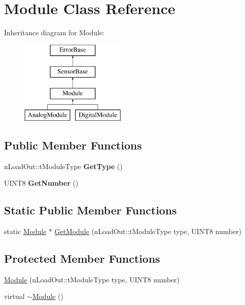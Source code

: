 \hypertarget{classModule}{
\section{Module Class Reference}
\label{classModule}
}
Inheritance diagram for Module:\begin{figure}[H]
\begin{center}
\leavevmode
\includegraphics[height=4.000000cm]{classModule}
\end{center}
\end{figure}
\subsection*{Public Member Functions}
\begin{DoxyCompactItemize}
\item 
\hypertarget{classModule_a2f5d1b9ba82cf4661ecf0306824fdce6}{
nLoadOut::tModuleType {\bfseries GetType} ()}
\label{classModule_a2f5d1b9ba82cf4661ecf0306824fdce6}

\item 
\hypertarget{classModule_ac414ba5cf992fdf69135d29cd3663fa6}{
UINT8 {\bfseries GetNumber} ()}
\label{classModule_ac414ba5cf992fdf69135d29cd3663fa6}

\end{DoxyCompactItemize}
\subsection*{Static Public Member Functions}
\begin{DoxyCompactItemize}
\item 
static \hyperlink{classModule}{Module} $\ast$ \hyperlink{classModule_a1f5bf14617d367a0cbe99d84a5eecb8b}{GetModule} (nLoadOut::tModuleType type, UINT8 number)
\end{DoxyCompactItemize}
\subsection*{Protected Member Functions}
\begin{DoxyCompactItemize}
\item 
\hyperlink{classModule_a0a7eb292c2e57e00bcda3c41decd7476}{Module} (nLoadOut::tModuleType type, UINT8 number)
\item 
virtual \hyperlink{classModule_a7c9d9c096786d127590fdd8aa2b7d681}{$\sim$Module} ()
\end{DoxyCompactItemize}
